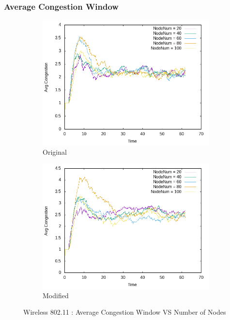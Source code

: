 \subsubsection{Average Congestion Window}
    \begin{figure}[!h] 
    	\centering
    	
    	\begin{subfigure}{0.9\textwidth} %
    		\includegraphics[width=.9\textwidth]{Pictures/Wireless802.11Mobile/Original/Avg_CongestionVSNodeNum.png}
    		 \caption{Original} %
    	\end{subfigure}
    	
    	\vspace{1em} %
    	
    	\begin{subfigure}{0.9\textwidth} %
    		\includegraphics[width=.9\textwidth]{Pictures/Wireless802.11Mobile/Modified/Avg_CongestionVSNodeNum.png}
    		 \caption{ Modified} %
    	\end{subfigure}
    	
    	 \caption{Wireless 802.11 : Average Congestion Window VS Number of Nodes} %
    \end{figure}
    
